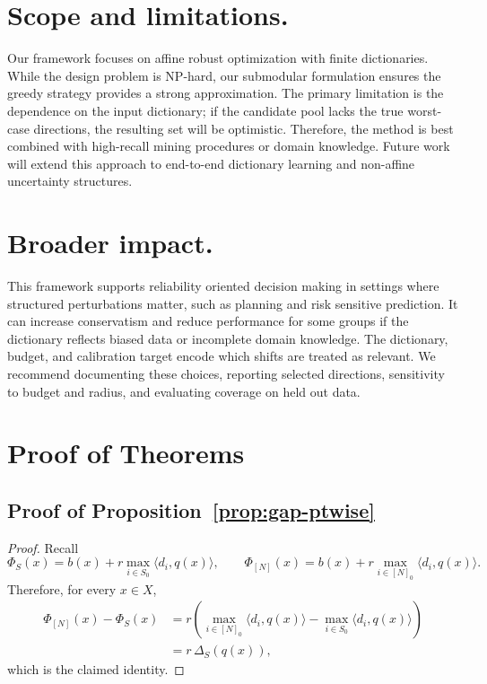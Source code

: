 \documentclass[accepted]{uai2026}
\theoremstyle{plain}
\theoremstyle{definition}
\theoremstyle{remark}
\begin{document}
\section{Scope and limitations.}
\label{sec:limitations}

Our framework focuses on affine robust optimization with finite dictionaries. While the design problem is NP-hard, our submodular formulation ensures the greedy strategy provides a strong approximation. The primary limitation is the dependence on the input dictionary; if the candidate pool lacks the true worst-case directions, the resulting set will be optimistic. Therefore, the method is best combined with high-recall mining procedures or domain knowledge. Future work will extend this approach to end-to-end dictionary learning and non-affine uncertainty structures.

\section{Broader impact.}
This framework supports reliability oriented decision making in settings where structured perturbations matter, such as planning and risk sensitive prediction. It can increase conservatism and reduce performance for some groups if the dictionary reflects biased data or incomplete domain knowledge. The dictionary, budget, and calibration target encode which shifts are treated as relevant. We recommend documenting these choices, reporting selected directions, sensitivity to budget and radius, and evaluating coverage on held out data.

\section{Proof of Theorems}


\subsection{Proof of Proposition~\ref{prop:gap-ptwise}}
\label{app:prop2_3}

\begin{proof}
Recall
\[
\Phi_S(x)=b(x)+r\max_{i\in S_0}\langle d_i,q(x)\rangle,
\qquad
\Phi_{[N]}(x)=b(x)+r\max_{i\in [N]_0}\langle d_i,q(x)\rangle.
\]
Therefore, for every $x\in X$,
\begin{align*}
\Phi_{[N]}(x)-\Phi_S(x)
&=r\left(\max_{i\in [N]_0}\langle d_i,q(x)\rangle-\max_{i\in S_0}\langle d_i,q(x)\rangle\right)\\
&=r\,\Delta_S(q(x)),
\end{align*}
which is the claimed identity.
\end{proof}
\end{document}
